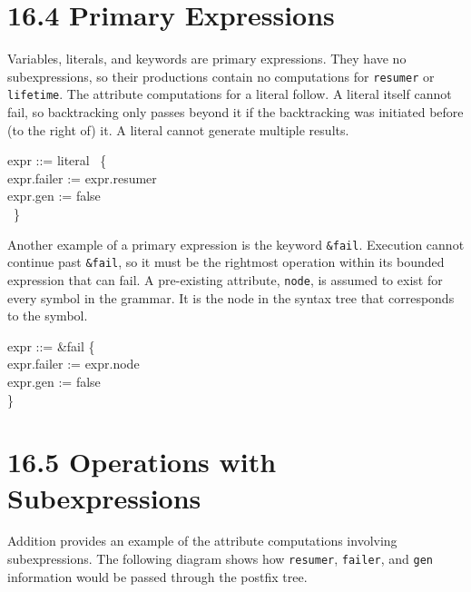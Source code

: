 \section[16.4 Primary Expressions]{16.4 Primary Expressions}

Variables, literals, and keywords are primary expressions. They have
no subexpressions, so their productions contain no computations for
\texttt{resumer} or \texttt{lifetime}. The attribute computations for
a literal follow. A literal itself cannot fail, so backtracking only
passes beyond it if the backtracking was initiated before (to the
right of) it. A literal cannot generate multiple results.

\goodbreak
\begin{iconcode}
\>expr ::= literal \>\>\>\>\ \{\\
\>\>\>\>\>\>expr.failer := expr.resumer\\
\>\>\>\>\>\>expr.gen := false\\
\>\>\>\>\>\ \}\\
\end{iconcode}



Another example of a primary expression is the keyword
\texttt{\&fail}. Execution cannot continue past \texttt{\&fail}, so it
must be the rightmost operation within its bounded expression that can
fail. A pre-existing attribute, \texttt{node}, is assumed to exist for
every symbol in the grammar. It is the node in the syntax tree that
corresponds to the symbol.

\goodbreak
\begin{iconcode}
\>expr ::= \&fail\>\>\>\> \{\\
\>\>\>\>\>\>expr.failer := expr.node\\
\>\>\>\>\>\>expr.gen := false\\
\>\>\>\>\>\}\\
\end{iconcode}


\section[16.5 Operations with Subexpressions]{16.5 Operations with Subexpressions}

Addition provides an example of the attribute computations involving
subexpressions. The following diagram shows how \texttt{resumer},
\texttt{failer}, and \texttt{gen} information would be passed through
the postfix tree.


